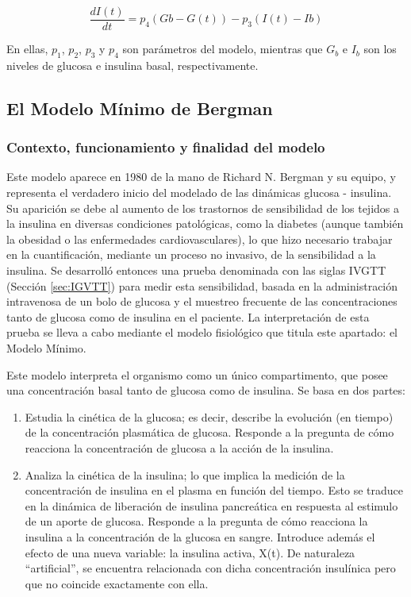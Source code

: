 \begin{equation}
\frac{dI(t)}{dt} = p_4 (Gb-G(t))-p_3(I(t)-Ib) 
\end{equation}

En ellas, $p_1$, $p_2$, $p_3$ y $p_4$ son parámetros del modelo, mientras que $G_b$ e $I_b$ son los niveles de glucosa e insulina basal, respectivamente. 

	

\subsection{El Modelo Mínimo de Bergman}
\subsubsection{Contexto, funcionamiento y finalidad del modelo}
Este modelo aparece en 1980 de la mano de Richard N. Bergman y su equipo, y representa el verdadero inicio del modelado de las dinámicas glucosa - insulina. 
Su aparición se debe al aumento de los trastornos de sensibilidad de los tejidos a la insulina en diversas condiciones patológicas, como la diabetes (aunque también la obesidad o las enfermedades cardiovasculares), lo que hizo necesario trabajar en la cuantificación, mediante un proceso no invasivo, de la sensibilidad a la insulina. Se desarrolló entonces una prueba denominada con las siglas IVGTT (Sección \ref{sec:IGVTT}) para medir esta sensibilidad, basada en la administración intravenosa de un bolo de glucosa y el muestreo frecuente de las concentraciones tanto de glucosa como de insulina en el paciente. La interpretación de esta prueba se lleva a cabo mediante el modelo fisiológico que titula este apartado: el Modelo Mínimo.

Este modelo interpreta el organismo como un único compartimento, que posee una concentración basal tanto de glucosa como de insulina. Se basa en dos partes: 
\begin{enumerate}
    \item Estudia la cinética de la glucosa; es decir, describe la evolución (en tiempo) de la concentración plasmática de glucosa. Responde a la pregunta de cómo reacciona la concentración de glucosa a la acción de la insulina.
    \item Analiza la cinética de la insulina; lo que implica la medición de la concentración de insulina en el plasma en función del tiempo. Esto se traduce en la dinámica de liberación de insulina pancreática en respuesta al estimulo de un aporte de glucosa. Responde a la pregunta de cómo reacciona la insulina a la concentración de la glucosa en sangre. Introduce además el efecto de una nueva variable: la insulina activa, X(t).  De naturaleza “artificial”, se encuentra relacionada con dicha concentración insulínica pero que no coincide exactamente con ella.
\end{enumerate}

